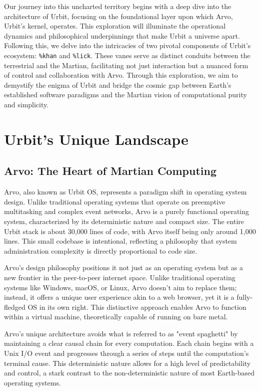 \documentclass[twoside]{article}
\begin{document}
Our journey into this uncharted territory begins with a deep dive into the architecture of Urbit, focusing on the foundational layer upon which Arvo, Urbit's kernel, operates.
This exploration will illuminate the operational dynamics and philosophical underpinnings that make Urbit a universe apart. 
Following this, we delve into the intricacies of two pivotal components of Urbit’s ecosystem: 
\texttt{\%khan} and \texttt{\%lick}. 
These vanes serve as distinct conduits between the terrestrial and the Martian, facilitating not just interaction but a nuanced form of control and collaboration with Arvo.
Through this exploration, we aim to demystify the enigma of Urbit and bridge the cosmic gap between Earth’s established software paradigms and the Martian vision of computational purity and simplicity.

\section{Urbit's Unique Landscape}

\subsection{Arvo: The Heart of Martian Computing}
Arvo, also known as Urbit OS, represents a paradigm shift in operating system design. Unlike traditional operating systems that operate on preemptive multitasking and complex event networks, Arvo is a purely functional operating system, characterized by its deterministic nature and compact size. The entire Urbit stack is about 30,000 lines of code, with Arvo itself being only around 1,000 lines. This small codebase is intentional, reflecting a philosophy that system administration complexity is directly proportional to code size.

Arvo's design philosophy positions it not just as an operating system but as a new frontier in the peer-to-peer internet space. Unlike traditional operating systems like Windows, macOS, or Linux, Arvo doesn't aim to replace them; instead, it offers a unique user experience akin to a web browser, yet it is a fully-fledged OS in its own right. This distinctive approach enables Arvo to function within a virtual machine, theoretically capable of running on bare metal.

Arvo's unique architecture avoids what is referred to as "event spaghetti" by maintaining a clear causal chain for every computation. Each chain begins with a Unix I/O event and progresses through a series of steps until the computation's terminal cause. This deterministic nature allows for a high level of predictability and control, a stark contrast to the non-deterministic nature of most Earth-based operating systems.
\end{document}
